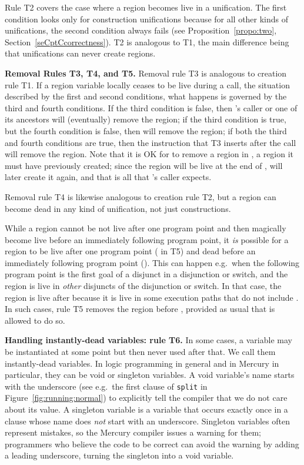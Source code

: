 \documentclass{tlp}
\newcommand{\code}[1]{{\tt#1}}
\begin{document}
Rule T2 covers the case where a region becomes live in a unification.
The first condition looks only for construction unifications
because for all other kinds of unifications,
the second condition always fails
(see Proposition~\ref{propo:two}, Section~\ref{seCptCcorrectness}).
T2 is analogous to T1, the main difference being that
unifications can never create regions.

\noindent\textbf{Removal Rules T3, T4, and T5.}
Removal rule T3 is analogous to creation rule T1.
If a region variable locally ceases to be live during a call,
the situation described by the first and second conditions,
what happens is governed by the third and fourth conditions.
If the third condition is false,
then 's caller or one of its ancestors will (eventually) remove the region;
if the third condition is true,
but the fourth condition is false,
then  will remove the region;
if both the third and fourth conditions are true,
then the instruction that T3 inserts after the call will remove the region.
Note that it is OK for  to remove a region in ,
a region it must have previously created;
since the region will be live at the end of ,
 will later create it again,
and that is all that 's caller expects.

Removal rule T4 is likewise analogous to creation rule T2,
but a region can become dead in any kind of unification,
not just constructions.

While a region cannot be not live after one program point
and then magically become live before an immediately following program point,
it \emph{is} possible for a region
to be live after one program point ( in T5)
and dead before an immediately following program point ().
This can happen e.g.\ when the following program point
is the first goal of a disjunct in a disjunction or switch,
and the region is live in \emph{other} disjuncts of the disjunction or switch.
In that case, the region is live after 
because it is live in some execution paths that do not include .
In such cases, rule T5 removes the region before ,
provided as usual that  is allowed to do so.

\noindent\textbf{Handling instantly-dead variables: rule T6.}
In some cases,
a variable may be instantiated at some point but then never used after that.
We call them instantly-dead variables.
In logic programming in general and in Mercury in particular,
they can be void or singleton variables.
A void variable's name starts with the underscore
(see e.g.\ the first clause of \code{split} in Figure~\ref{fig:running:normal})
to explicitly tell the compiler that we do not care about its value.
A singleton variable
is a variable that occurs exactly once in a clause
whose name does \emph{not} start with an underscore.
Singleton variables often represent mistakes,
so the Mercury compiler issues a warning for them;
programmers who believe the code to be correct
can avoid the warning by adding a leading underscore,
turning the singleton into a void variable.
\end{document}
